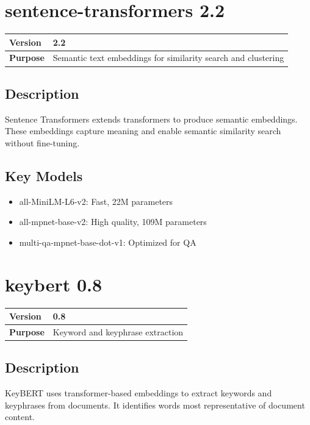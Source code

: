 \documentclass[12pt,a4paper]{report}
\begin{document}
\section{sentence-transformers 2.2}

\begin{tabular}{|p{4cm}|p{10cm}|}
\hline
\textbf{Version} & 2.2 \\
\hline
\textbf{Purpose} & Semantic text embeddings for similarity search and clustering \\
\hline
\end{tabular}

\subsection{Description}

Sentence Transformers extends transformers to produce semantic embeddings. These embeddings capture meaning and enable semantic similarity search without fine-tuning.

\subsection{Key Models}

\begin{itemize}
    \item all-MiniLM-L6-v2: Fast, 22M parameters
    \item all-mpnet-base-v2: High quality, 109M parameters
    \item multi-qa-mpnet-base-dot-v1: Optimized for QA
\end{itemize}

\section{keybert 0.8}

\begin{tabular}{|p{4cm}|p{10cm}|}
\hline
\textbf{Version} & 0.8 \\
\hline
\textbf{Purpose} & Keyword and keyphrase extraction \\
\hline
\end{tabular}

\subsection{Description}

KeyBERT uses transformer-based embeddings to extract keywords and keyphrases from documents. It identifies words most representative of document content.
\end{document}
